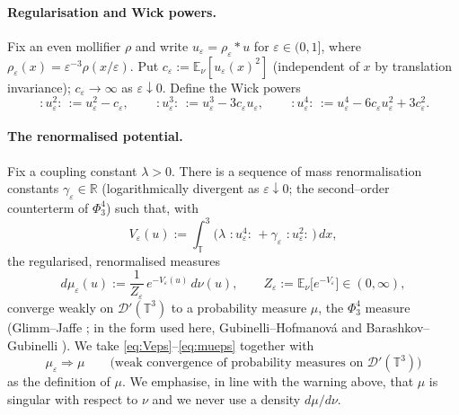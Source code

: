 \documentclass[12pt]{article}
\theoremstyle{definition}
\newcommand{\T}{\mathbb{T}^3}
\newcommand{\R}{\mathbb{R}}
\newcommand{\E}{\mathbb{E}}
\newcommand{\D}{\mathcal{D}'(\T)}
\newcommand{\Wick}[1]{\,{:}#1{:}\,}
\begin{document}
\paragraph{Regularisation and Wick powers.}
Fix an even mollifier $\rho$ and write $u_\varepsilon=\rho_\varepsilon*u$ for
$\varepsilon\in(0,1]$, where $\rho_\varepsilon(x)=\varepsilon^{-3}\rho(x/\varepsilon)$.
Put $c_\varepsilon:=\E_\nu[u_\varepsilon(x)^2]$ (independent of $x$ by translation
invariance); $c_\varepsilon\to\infty$ as $\varepsilon\downarrow0$. Define the Wick powers
\begin{equation}\label{eq:wick}
  \Wick{u_\varepsilon^2}:=u_\varepsilon^2-c_\varepsilon,\qquad
  \Wick{u_\varepsilon^3}:=u_\varepsilon^3-3c_\varepsilon u_\varepsilon,\qquad
  \Wick{u_\varepsilon^4}:=u_\varepsilon^4-6c_\varepsilon u_\varepsilon^2+3c_\varepsilon^2 .
\end{equation}

\paragraph{The renormalised potential.}
Fix a coupling constant $\lambda>0$. There is a sequence of mass renormalisation
constants $\gamma_\varepsilon\in\R$ (logarithmically divergent as $\varepsilon\downarrow0$;
the second--order counterterm of $\Phi^4_3$) such that, with
\begin{equation}\label{eq:Veps}
  V_\varepsilon(u):=\int_\T\Big(\lambda\,\Wick{u_\varepsilon^4}
     +\gamma_\varepsilon\,\Wick{u_\varepsilon^2}\Big)\,dx ,
\end{equation}
the regularised, renormalised measures
\begin{equation}\label{eq:mueps}
  d\mu_\varepsilon(u):=\frac{1}{Z_\varepsilon}\,e^{-V_\varepsilon(u)}\,d\nu(u),
  \qquad Z_\varepsilon:=\E_\nu\!\big[e^{-V_\varepsilon}\big]\in(0,\infty),
\end{equation}
converge weakly on $\D$ to a probability measure $\mu$, the $\Phi^4_3$ measure
(Glimm--Jaffe \cite{GJ}; in the form used here, Gubinelli--Hofmanov\'a \cite{GH} and
Barashkov--Gubinelli \cite{BG}). We take \eqref{eq:Veps}--\eqref{eq:mueps} together with
\begin{equation}\label{eq:weak}
  \mu_\varepsilon\Rightarrow\mu\qquad\text{(weak convergence of probability measures on }\D\text{)}
\end{equation}
as the definition of $\mu$. We emphasise, in line with the warning above, that $\mu$ is
singular with respect to $\nu$ and we never use a density $d\mu/d\nu$.
\end{document}
